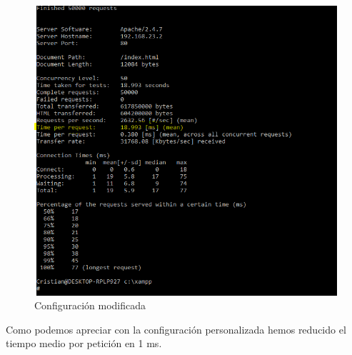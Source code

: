 \begin{enumerate}[label=(\alph*)]
\begin{itemize}
		\begin{figure}[H] %
		\centering
		\includegraphics[scale=0.5]{pics/14}  %
		\caption{Configuración modificada} \label{fig:8}
	\end{figure}
	
\end{itemize}

Como podemos apreciar con la configuración personalizada hemos reducido el tiempo medio por petición en 1 ms.

\end{enumerate}






\grid
